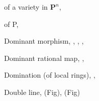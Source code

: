 {{\noindent\hspace*{7.5bp}of a variety in $\mathbf P^n$, \par
\noindent\hspace*{7.5bp}of P, \par
\noindent\hspace*{0.0bp}Dominant morphism, , , , \par
\noindent\hspace*{0.0bp}Dominant rational map, , \par
\noindent\hspace*{0.0bp}Domination (of local rings), , \par
\noindent\hspace*{0.0bp}Double line,  (Fig),  (Fig)\par
}
}
